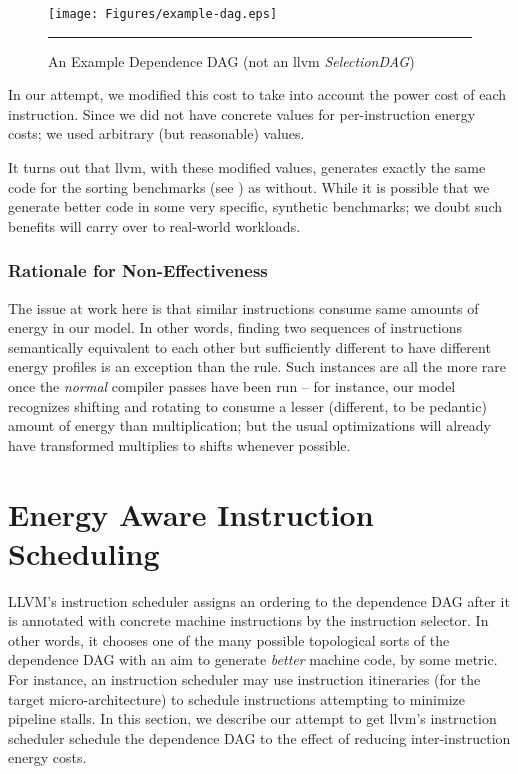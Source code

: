 \begin{figure}[htbp]
  \centering
  \texttt{[image: Figures/example-dag.eps]}
  \rule{35em}{0.3pt}
  \caption{An Example Dependence DAG (not an llvm
    \textit{SelectionDAG})}
  \label{fig:example-dag}
\end{figure}

In our attempt, we modified this cost to take into account the power
cost of each instruction.  Since we did not have concrete values for
per-instruction energy costs; we used arbitrary (but reasonable)
values.

It turns out that llvm, with these modified values, generates exactly
the same code for the sorting benchmarks (see
) as without.  While it is possible
that we generate better code in some very specific, synthetic
benchmarks; we doubt such benefits will carry over to real-world
workloads.

\subsubsection{Rationale for Non-Effectiveness}

The issue at work here is that similar instructions consume same
amounts of energy in our model.  In other words, finding two sequences
of instructions semantically equivalent to each other but sufficiently
different to have different energy profiles is an exception than the
rule.  Such instances are all the more rare once the \textit{normal}
compiler passes have been run -- for instance, our model recognizes
shifting and rotating to consume a lesser (different, to be pedantic)
amount of energy than multiplication; but the usual optimizations will
already have transformed multiplies to shifts whenever possible.

\section{Energy Aware Instruction Scheduling}

LLVM's instruction scheduler assigns an ordering to the dependence DAG
after it is annotated with concrete machine instructions by the
instruction selector.  In other words, it chooses one of the many
possible topological sorts of the dependence DAG with an aim to
generate \textit{better} machine code, by some metric.  For instance,
an instruction scheduler may use instruction itineraries (for the
target micro-architecture) to schedule instructions attempting to
minimize pipeline stalls.  In this section, we describe our attempt to
get llvm's instruction scheduler schedule the dependence DAG to the
effect of reducing inter-instruction energy costs.

